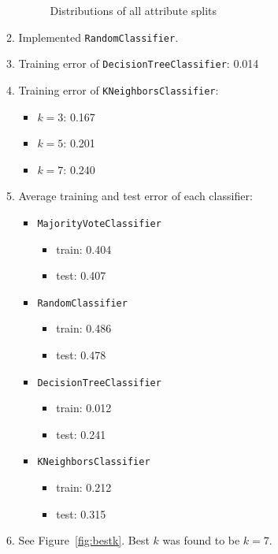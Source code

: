 \documentclass[11pt]{article}
\begin{document}
\begin{itemize}
\begin{enumerate}
\begin{figure}
        \caption{Distributions of all attribute splits}\label{fig:histograms}
      \end{figure}
      \restoregeometry

      \item Implemented \texttt{RandomClassifier}.
      \item Training error of \texttt{DecisionTreeClassifier}: 0.014
      \item Training error of \texttt{KNeighborsClassifier}:
        \begin{itemize}
          \item $k = 3$: 0.167
          \item $k = 5$: 0.201
          \item $k = 7$: 0.240
        \end{itemize}
      \item Average training and test error of each classifier:
        \begin{itemize}
          \item \texttt{MajorityVoteClassifier}
            \begin{itemize}
              \item train: 0.404
              \item test: 0.407
            \end{itemize}
          \item \texttt{RandomClassifier}
            \begin{itemize}
              \item train: 0.486
              \item test: 0.478
            \end{itemize}
          \item \texttt{DecisionTreeClassifier}
            \begin{itemize}
              \item train: 0.012
              \item test: 0.241
            \end{itemize}
          \item \texttt{KNeighborsClassifier}
            \begin{itemize}
              \item train: 0.212
              \item test: 0.315
            \end{itemize}
        \end{itemize}
        
      \item See Figure~\ref{fig:bestk}. Best $k$ was found to be $k=7$.


\end{enumerate}
\end{itemize}
\end{document}
